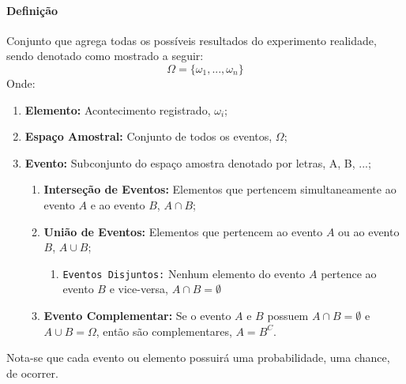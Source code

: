 \documentclass{article}
\begin{document}
            \paragraph{Definição}Conjunto que agrega todas os possíveis resultados do experimento realidade, sendo denotado como mostrado a seguir:
                \begin{equation}
                    \boxed{
                        \Omega = \{\omega_{1}, ... , \omega_{n} \}
                    }
                \end{equation}
            Onde:
                \begin{enumerate}[rightmargin = \leftmargin, noitemsep]
                    \item \textbf{Elemento:} Acontecimento registrado, $\omega_{i}$;

                    \item \textbf{Espaço Amostral:} Conjunto de todos os eventos, $\Omega$;

                    \item \textbf{Evento:} Subconjunto do espaço amostra denotado por letras, A, B, ...;
                        \begin{enumerate}[rightmargin = \leftmargin]
                            \item \textbf{Interseção de Eventos:} Elementos que pertencem simultaneamente ao evento $A$ e ao evento $B$, $A \cap B$;

                            \item \textbf{União de Eventos:} Elementos que pertencem ao evento $A$ ou ao evento $B$, $A \cup B$;
                                \begin{enumerate}[rightmargin = \leftmargin, noitemsep]
                                    \item \texttt{Eventos Disjuntos:} Nenhum elemento do evento $A$ pertence ao evento $B$ e vice-versa, $A \cap B = \emptyset$
                                \end{enumerate}

                            \item \textbf{Evento Complementar:} Se o evento $A$ e $B$ possuem $A\cap B = \emptyset$ e $A \cup B = \Omega$, então são complementares, $A = B^{C}$.
                        \end{enumerate}
                \end{enumerate}
            Nota-se que cada evento ou elemento possuirá uma probabilidade, uma chance, de ocorrer.
\end{document}
